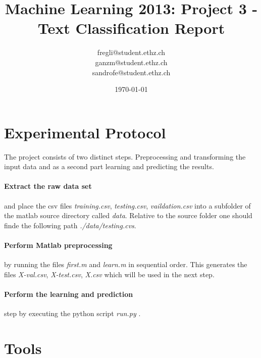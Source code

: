 \documentclass[a4paper, 11pt]{article}
\title{Machine Learning 2013: Project 3 - Text Classification Report}
\author{fregli@student.ethz.ch\\ ganzm@student.ethz.ch\\ sandrofe@student.ethz.ch\\}
\date{\today}
\begin{document}
\maketitle

\section*{Experimental Protocol}

The project consists of two distinct steps. Preprocessing and transforming the input data and as a second part learning and predicting the results.

\paragraph{Extract the raw data set} and place the csv files \textit{training.csv}, \textit{testing.csv}, \textit{vaildation.csv} into a subfolder of the matlab source directory called \textit{data}. Relative to the source folder one should finde the following path \textit{./data/testing.cvs}.

\paragraph{Perform Matlab preprocessing} by running the files \textit{first.m} and \textit{learn.m} in sequential order. This generates the files \textit{X-val.csv}, \textit{X-test.csv}, \textit{X.csv} which will be used in the next step.

\paragraph{Perform the learning and prediction} step by executing the python script \textit{run.py} .\\

\section{Tools}
\end{document}
